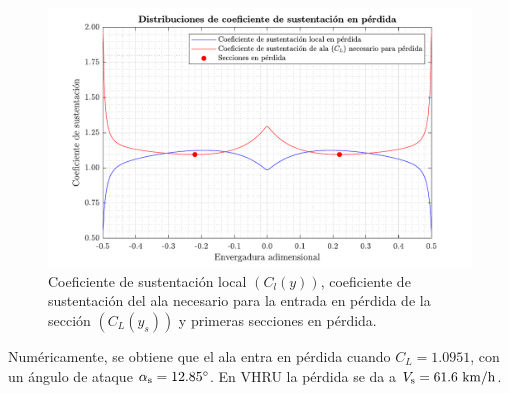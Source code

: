 \begin{figure}[h]
    \centering
    \includegraphics[width=\linewidth]{imagenes/propiedades_perdida/stall_lift_distribution.pdf}
    \caption{Coeficiente de sustentación local $\left( C_l(y) \right)$, coeficiente de sustentación del ala necesario para la entrada en pérdida de la sección $\left( C_L(y_s) \right)$ y primeras secciones en pérdida.}
    \label{fig:stall_lift_distribution}
    \vspace{-4mm}
\end{figure}

Numéricamente, se obtiene que el ala entra en pérdida cuando $C_L = 1.0951$, con un ángulo de ataque $\alpha_\text{s} = 12.85 \degrees$. En VHRU la pérdida se da a $V_\text{s} = 61.6 \ \kilo\meter / \hour$.